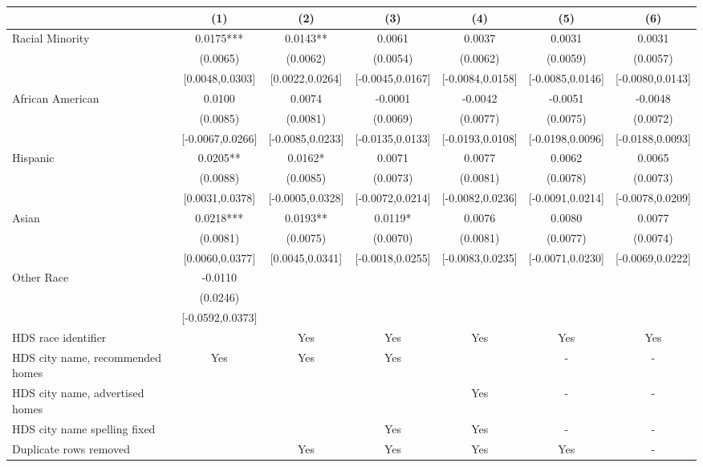 \begin{table}[htbp]
{\begin{tabular}{l*{6}{c}}
                    \cmidrule(lr){2-2}\cmidrule(lr){3-3}\cmidrule(lr){4-4}\cmidrule(lr){5-5}\cmidrule(lr){6-6}\cmidrule(lr){7-7}
                    &\multicolumn{1}{c}{(1)}   &\multicolumn{1}{c}{(2)}   &\multicolumn{1}{c}{(3)}   &\multicolumn{1}{c}{(4)}   &\multicolumn{1}{c}{(5)}   &\multicolumn{1}{c}{(6)}\\
\midrule
Racial Minority & 0.0175*** & 0.0143** & 0.0061 & 0.0037 & 0.0031 & 0.0031 \\
 & (0.0065) & (0.0062) & (0.0054) & (0.0062) & (0.0059) & (0.0057) \\
 & [0.0048,0.0303] & [0.0022,0.0264] & [-0.0045,0.0167] & [-0.0084,0.0158] & [-0.0085,0.0146] & [-0.0080,0.0143] \\
\midrule
African American & 0.0100 & 0.0074 & -0.0001 & -0.0042 & -0.0051 & -0.0048 \\
 & (0.0085) & (0.0081) & (0.0069) & (0.0077) & (0.0075) & (0.0072) \\
 & [-0.0067,0.0266] & [-0.0085,0.0233] & [-0.0135,0.0133] & [-0.0193,0.0108] & [-0.0198,0.0096] & [-0.0188,0.0093] \\
Hispanic & 0.0205** & 0.0162* & 0.0071 & 0.0077 & 0.0062 & 0.0065 \\
 & (0.0088) & (0.0085) & (0.0073) & (0.0081) & (0.0078) & (0.0073) \\
 & [0.0031,0.0378] & [-0.0005,0.0328] & [-0.0072,0.0214] & [-0.0082,0.0236] & [-0.0091,0.0214] & [-0.0078,0.0209] \\
Asian & 0.0218*** & 0.0193** & 0.0119* & 0.0076 & 0.0080 & 0.0077 \\
 & (0.0081) & (0.0075) & (0.0070) & (0.0081) & (0.0077) & (0.0074) \\
 & [0.0060,0.0377] & [0.0045,0.0341] & [-0.0018,0.0255] & [-0.0083,0.0235] & [-0.0071,0.0230] & [-0.0069,0.0222] \\
Other Race & -0.0110 &  &  &  &  &  \\
 & (0.0246) &  &  &  &  &  \\
 & [-0.0592,0.0373] &  &  &  &  &  \\
\midrule
HDS race identifier & & Yes & Yes & Yes & Yes & Yes \\
HDS city name, recommended homes & Yes & Yes & Yes & & - & -\\
HDS city name, advertised homes &  &  &  & Yes & - & -\\
HDS city name spelling fixed & & & Yes & Yes & - & -\\
Duplicate rows removed &  & Yes & Yes & Yes & Yes & - \\

\end{tabular}}
\end{table}

